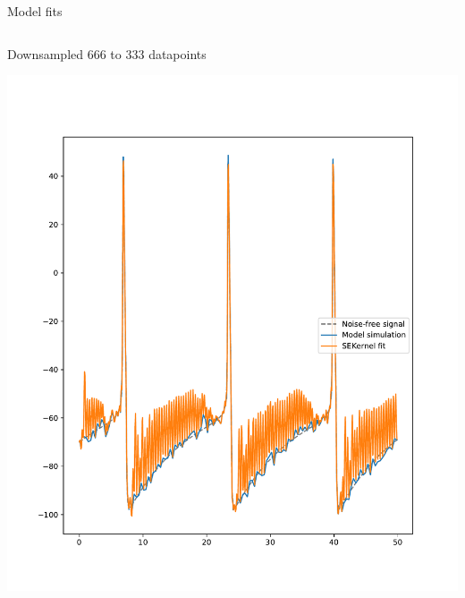 \documentclass[presentation]{beamer}
\begin{document}
\begin{frame}[plain,label={sec:org8a1d207}]{Model fits}
\begin{columns}
\begin{column}{0.5\columnwidth}
\begin{center}
Downsampled 666 to 333 datapoints
\end{center}
\begin{center}
\includegraphics[width=1.1\textwidth]{./downsample333.pdf}
\end{center}
\end{column}


\end{columns}
\end{frame}
\end{document}
